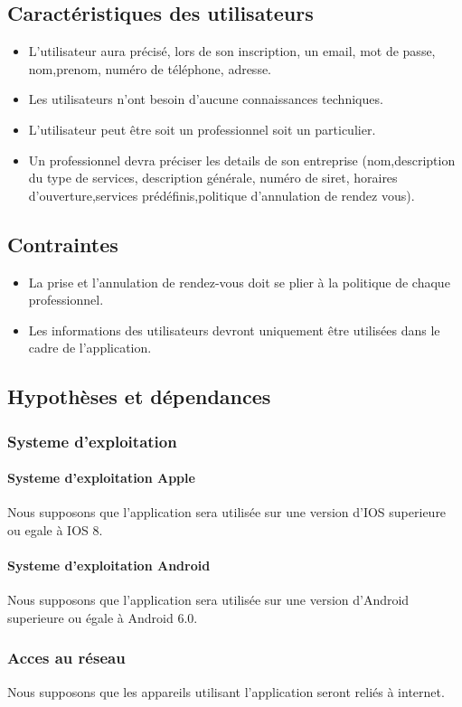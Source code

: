 \documentclass{article}
\begin{document}
\subsection{Caractéristiques des utilisateurs}
\begin{itemize}
\item L'utilisateur aura précisé, lors de son inscription, un email, mot
de passe, nom,prenom, numéro de téléphone, adresse.
\item Les utilisateurs n'ont besoin d'aucune connaissances techniques.
\item L'utilisateur peut être soit un professionnel soit un particulier.
\item Un professionnel devra préciser les details de son entreprise (nom,description du
	type de services, description générale, numéro de siret, horaires d'ouverture,services prédéfinis,politique d'annulation de rendez vous).
\end{itemize}
\subsection{Contraintes}
\begin{itemize}
\item La prise et l'annulation de rendez-vous doit se plier à la
  politique de chaque professionnel.
\item Les informations des utilisateurs devront uniquement être
  utilisées dans le cadre de l'application.
\end{itemize}
\subsection{Hypothèses et dépendances}
\subsubsection{Systeme d'exploitation}
\paragraph{Systeme d'exploitation Apple}
Nous supposons que l'application sera utilisée sur une version d'IOS superieure ou egale à IOS 8.
\paragraph{Systeme d'exploitation Android}
Nous supposons que l'application sera utilisée sur une version d'Android superieure ou égale à Android 6.0.
\subsubsection{Acces au réseau}
Nous supposons que les appareils utilisant l'application seront reliés à internet.
\end{document}
